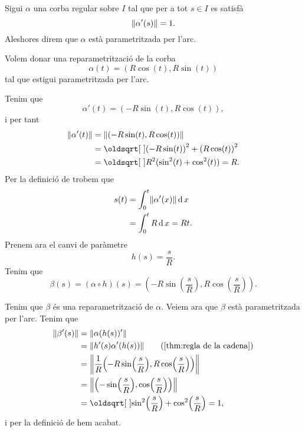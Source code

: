 \documentclass[../../Main.tex]{subfiles}
\begin{document}
	\begin{definition}
		\label{def:corba parametritzada per l'arc}
		Sigui \(\alpha\) una corba regular sobre \(I\) tal que per a tot \(s\in I\) es satisfà
		\[\norm{\alpha'(s)}=1.\]
		Aleshores direm que \(\alpha\) està parametritzada per l'arc.
	\end{definition}
	\begin{example} %
		\label{ex:reparametrització per l'arc del cercle de radi R}
		\label{ex:circumferència de radi R parametritzat per l'arc}
		Volem donar una reparametrització de la corba
		\[\alpha(t)=(R\cos(t),R\sin(t))\]
		tal que estigui parametritzada per l'arc.
		\begin{solution}
			Tenim que
			\[\alpha'(t)=(-R\sin(t),R\cos(t)),\]
			i per tant
			\begin{align*}
				\norm{\alpha'(t)}&=\norm{(-R\sin(t),R\cos(t))} \\
				&=\sqrt{{(-R\sin(t))}^{2}+{(R\cos(t))}^{2}} \\
				&=\sqrt{R^{2}(\sin^{2}(t)+\cos^{2}(t))}=R.
			\end{align*}
			Per la definició de  trobem que
			\begin{align*}
				s(t)&=\int_{0}^{t}\norm{\alpha'(x)}\diff x \\
				&=\int_{0}^{t}R\diff x=Rt.
			\end{align*}
			Prenem ara el canvi de paràmetre
			\[h(s)=\frac{s}{R}.\]
			Tenim que
			\[\beta(s)=(\alpha\circ h)(s)=\left(-R\sin\left(\frac{s}{R}\right),R\cos\left(\frac{s}{R}\right)\right).\]
			
			Tenim que \(\beta\) és una reparametrització de \(\alpha\). Veiem ara que \(\beta\) està parametritzada per l'arc. Tenim que
			\begin{align*}
				\norm{\beta'(s)}&=\norm{\alpha(h(s))'} \\
				&=\norm{h'(s)\alpha'(h(s))} \tag{\ref{thm:regla de la cadena}}\\
				&=\norm{\frac{1}{R}\left(-R\sin\left(\frac{s}{R}\right),R\cos\left(\frac{s}{R}\right)\right)} \\
				&=\norm{\left(-\sin\left(\frac{s}{R}\right),\cos\left(\frac{s}{R}\right)\right)} \\
				&=\sqrt{\sin^{2}\left(\frac{s}{R}\right)+\cos^{2}\left(\frac{s}{R}\right)}=1,
			\end{align*}
			i per la definició de  hem acabat.
		\end{solution}
	\end{example}
\end{document}
